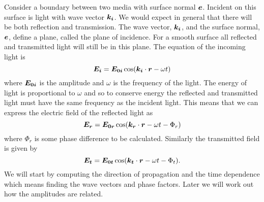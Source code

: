     Consider a boundary between two media with surface normal \(\bm{e}\).
    Incident on this surface is light with wave vector \(\bm{k_i}\).
    We would expect in general that there will be both reflection and transmission.
    The wave vector, \(\bm{k_i}\), and the surface normal, \(\bm{e}\), define a plane, called the plane of incidence.
    For a smooth surface all reflected and transmitted light will still be in this plane.
    The equation of the incoming light is
    \[\bm{E_i} = \bm{E_{0i}} \cos(\bm{k_i} \cdot \bm{r} - \omega t)\]
    where \(\bm{E_{0i}}\) is the amplitude and \(\omega\) is the frequency of the light.
    The energy of light is proportional to \(\omega\) and so to conserve energy the reflected and transmitted light must have the same frequency as the incident light.
    This means that we can express the electric field of the reflected light as
    \[\bm{E_r} = \bm{E_{0r}} \cos(\bm{k_r} \cdot \bm{r} - \omega t - \Phi_r)\]
    where \(\Phi_r\) is some phase difference to be calculated.
    Similarly the transmitted field is given by
    \[\bm{E_t} = \bm{E_{0t}} \cos(\bm{k_t} \cdot \bm{r} - \omega t - \Phi_t).\]
    We will start by computing the direction of propagation and the time dependence which means finding the wave vectors and phase factors.
    Later we will work out how the amplitudes are related.
    
